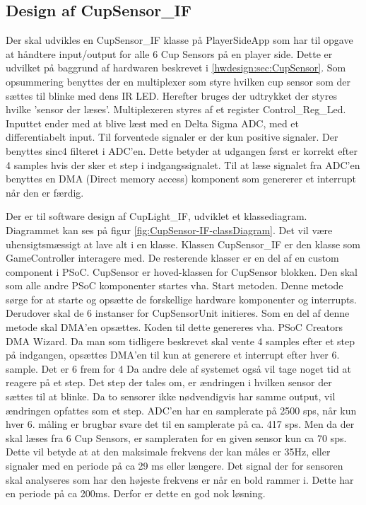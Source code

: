 \documentclass[Softwaredesign/Softwaredesign_main.tex]{subfiles}
\begin{document}
\subsection{Design af CupSensor\_IF} \label{sec:CupSensorSWDesign}
Der skal udvikles en CupSensor\_IF klasse på PlayerSideApp som har til opgave at håndtere input/output for alle 6 Cup Sensors på en player side. Dette er udvilket på baggrund af hardwaren beskrevet i \ref{hwdesign:sec:CupSensor}. Som opsummering benyttes der en multiplexer som styre hvilken cup sensor som der sættes til blinke med dens IR LED. Herefter bruges der udtrykket der styres hvilke 'sensor der læses'. Multiplexeren styres af et register Control\_Reg\_Led. Inputtet ender med at blive læst med en Delta Sigma ADC, med et differentiabelt input. Til forventede signaler er der kun positive signaler. Der benyttes sinc4 filteret i ADC'en. Dette betyder at udgangen først er korrekt efter 4 samples hvis der sker et step i indgangssignalet. Til at læse signalet fra ADC'en benyttes en DMA (Direct memory access) komponent som genererer et interrupt når den er færdig.

Der er til software design af CupLight\_IF, udviklet et klassediagram. Diagrammet kan ses på figur \ref{fig:CupSensor-IF-classDiagram}. Det vil være uhensigtsmæssigt at lave alt i en klasse. Klassen CupSensor\_IF er den klasse som GameController interagere med. De resterende klasser er en del af en custom component i PSoC\autocite{PSoCHowToCreateCustomComponents}. CupSensor er hoved-klassen for CupSensor blokken. Den skal som alle andre PSoC komponenter startes vha. Start metoden. Denne metode sørge for at starte og opsætte de forskellige hardware komponenter og interrupts. Derudover skal de 6 instanser for CupSensorUnit initieres. Som en del af denne metode skal DMA'en opsættes. Koden til dette genereres vha. PSoC Creators DMA Wizard\autocite[2]{DMADatasheet}. Da man som tidligere beskrevet skal vente 4 samples efter et step på indgangen, opsættes DMA'en til kun at generere et interrupt efter hver 6. sample. Det er 6 frem for 4 Da andre dele af systemet også vil tage noget tid at reagere på et step. Det step der tales om, er ændringen i hvilken sensor der sættes til at blinke. Da to sensorer ikke nødvendigvis har samme output, vil ændringen opfattes som et step. ADC'en har en samplerate på 2500 sps, når kun hver 6. måling er brugbar svare det til en samplerate på ca. 417 sps. Men da der skal læses fra 6 Cup Sensors, er sampleraten for en given sensor kun ca 70 sps. Dette vil betyde at at den maksimale frekvens der kan måles er 35Hz, eller signaler med en periode på ca 29 ms eller længere. Det signal der for sensoren skal analyseres som har den højeste frekvens er når en bold rammer i. Dette har en periode på ca 200ms. Derfor er dette en god nok løsning.
\end{document}
